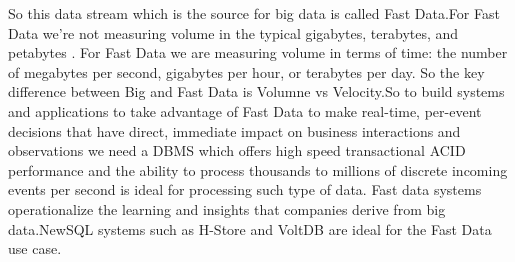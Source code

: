 \documentclass[9pt,twocolumn,twoside]{styles/osajnl}
\begin{document}
So this data stream which is the source for big data is called Fast Data.For Fast Data we're not measuring volume in the typical gigabytes, terabytes, and petabytes . For Fast Data we are measuring volume in terms of time: the number of megabytes per second, gigabytes per hour, or terabytes per day. So the key difference between Big and Fast Data is Volumne vs Velocity.So to build systems and applications to take advantage of Fast Data  to make real-time, per-event decisions that have direct, immediate impact on business interactions and observations we need a DBMS which  offers high speed transactional ACID performance and the ability to process thousands to millions of discrete incoming events per second is ideal for processing such type of data. Fast data systems operationalize the learning and insights that companies derive from big data.NewSQL systems such as H-Store and VoltDB are ideal for the Fast Data use case.\cite{www-FastData}
\end{document}
